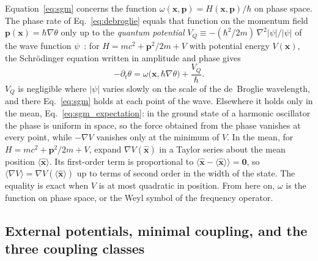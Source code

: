 \documentclass[aps,prd,onecolumn,tightenlines,nofootinbib,notitlepage,11pt,floatfix]{revtex4-2}
\theoremstyle{indentedtheorem}
\begin{document}
Equation~\eqref{eq:sgm} concerns the function $\omega(\mathbf{x},\mathbf{p}) = H(\mathbf{x},\mathbf{p})/\hbar$ on phase space. The phase rate of Eq.~\eqref{eq:debroglie} equals that function on the momentum field $\mathbf{p}(\mathbf{x}) = \hbar\nabla\theta$ only up to the \emph{quantum potential} $V_Q \equiv -(\hbar^2/2m)\,\nabla^2|\psi|/|\psi|$ of the wave function $\psi$~\citep{Madelung1927Quantentheorie,Bohm1952Suggested}: for $H = mc^2 + \mathbf{p}^2/2m + V$ with potential energy $V(\mathbf{x})$, the Schr\"odinger equation written in amplitude and phase gives
\begin{equation}
    -\partial_t\theta = \omega\big(\mathbf{x},\hbar\nabla\theta\big) + \frac{V_Q}{\hbar} .
    \label{eq:phase_rate_split}
\end{equation}
$V_Q$ is negligible where $|\psi|$ varies slowly on the scale of the de~Broglie wavelength, and there Eq.~\eqref{eq:sgm} holds at each point of the wave. Elsewhere it holds only in the mean, Eq.~\eqref{eq:sgm_expectation}: in the ground state of a harmonic oscillator the phase is uniform in space, so the force obtained from the phase vanishes at every point, while $-\nabla V$ vanishes only at the minimum of $V$. In the mean, for $H=mc^2+\mathbf{p}^2/2m+V$, expand $\nabla V(\hat{\mathbf{x}})$ in a Taylor series about the mean position $\langle\hat{\mathbf{x}}\rangle$. Its first-order term is proportional to $\langle\hat{\mathbf{x}}-\langle\hat{\mathbf{x}}\rangle\rangle=\mathbf{0}$, so $\langle\nabla V\rangle=\nabla V(\langle\hat{\mathbf{x}}\rangle)$ up to terms of second order in the width of the state. The equality is exact when $V$ is at most quadratic in position. From here on, $\omega$ is the function on phase space, or the Weyl symbol of the frequency operator.

\subsection{External potentials, minimal coupling, and the three coupling classes}
\label{sec:em}
\end{document}
